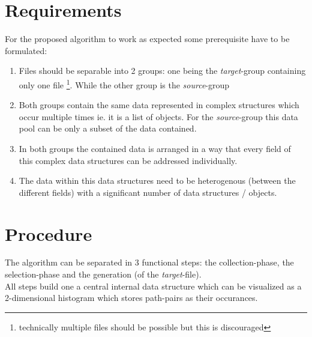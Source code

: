 \documentclass[conference]{IEEEtran}
\begin{document}
\section{Requirements}
For the proposed algorithm to work as expected some prerequisite have to be formulated:
\begin{enumerate}[label=(\roman*)]
 \item Files should be separable into 2 groups: one being the \textit{target}-group containing
        only one file \footnote{technically multiple files should be possible but this is
        discouraged}. While the other group is the \textit{source}-group
 \item Both groups contain the same data represented in complex structures which occur multiple
        times ie. it is a list of objects. For the \textit{source}-group this data pool can be
        only a subset of the data contained.
 \item In both groups the contained data is arranged in a way that every field of this complex
        data structures can be addressed individually.
 \item The data within this data structures need to be heterogenous (between the different
        fields) with a significant number of data structures / objects.
\end{enumerate}

\section{Procedure}
The algorithm can be separated in 3 functional steps: the collection-phase, the selection-phase
and the generation (of the \textit{target}-file).\\All steps build one a central internal data
structure which can be visualized as a 2-dimensional histogram which stores path-pairs as their
occurances.
\end{document}
